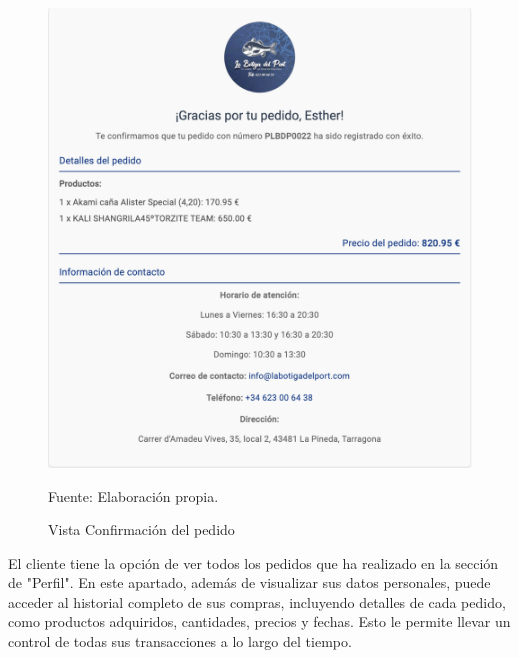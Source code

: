 \begin{figure}[H]
\begin{center}
\includegraphics[scale=0.5]{./Images/vistaConfirmacionPedido.png}
\caption{Vista Confirmación del pedido} Fuente: Elaboración propia.

\label{fig:fig1}

\end{center}
\end{figure}

El cliente tiene la opción de ver todos los pedidos que ha realizado en la sección de "Perfil". En este apartado, además de visualizar sus datos personales, puede acceder al historial completo de sus compras, incluyendo detalles de cada pedido, como productos adquiridos, cantidades, precios y fechas. Esto le permite llevar un control de todas sus transacciones a lo largo del tiempo.

